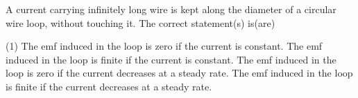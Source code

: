 
\item A current carrying infinitely long wire is kept along the diameter of a circular wire loop, without touching it. The correct statement(s) is(are)
    \begin{tasks}(1)
        \task The emf induced in the loop is zero if the current is constant.
        \task The emf induced in the loop is finite if the current is constant.
        \task The emf induced in the loop is zero if the current decreases at a steady rate.
        \task The emf induced in the loop is finite if the current decreases at a steady rate.
    \end{tasks}
